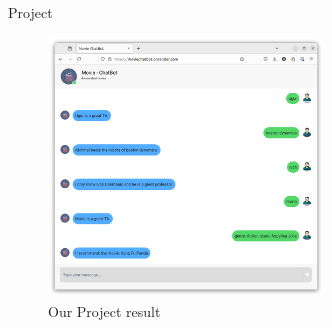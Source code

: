 \documentclass[xetex,notheorems,hyperref={pdfpagelabels=true},xcolor=table]{beamer}
\theoremstyle{plain}
\theoremstyle{definition}
\theoremstyle{example}
\theoremstyle{example}
\begin{document}
\begin{frame}{Project}
\begin{figure}
    \centering
    \includegraphics[width=0.65\textwidth]{png/result-correct.png}
    \caption{Our Project result}
    \label{fig:enter-label}
\end{figure}
\end{frame}
\end{document}
